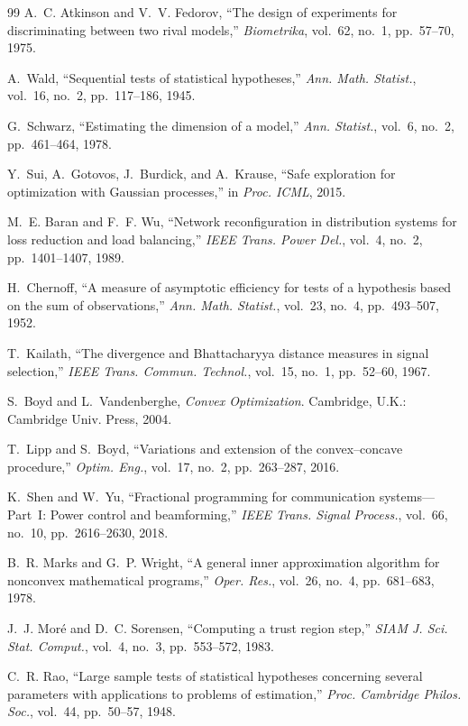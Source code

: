 \documentclass[journal,onecolumn,11pt]{IEEEtran}
\begin{document}
\begin{thebibliography}{99}
A.~C. Atkinson and V.~V. Fedorov, ``The design of experiments for discriminating between two rival models,'' \emph{Biometrika}, vol.~62, no.~1, pp.~57--70, 1975.

A.~Wald, ``Sequential tests of statistical hypotheses,'' \emph{Ann. Math. Statist.}, vol.~16, no.~2, pp.~117--186, 1945.

G.~Schwarz, ``Estimating the dimension of a model,'' \emph{Ann. Statist.}, vol.~6, no.~2, pp.~461--464, 1978.

Y.~Sui, A.~Gotovos, J.~Burdick, and A.~Krause, ``Safe exploration for optimization with Gaussian processes,'' in \emph{Proc. ICML}, 2015.

M.~E. Baran and F.~F. Wu, ``Network reconfiguration in distribution systems for loss reduction and load balancing,'' \emph{IEEE Trans. Power Del.}, vol.~4, no.~2, pp.~1401--1407, 1989.

H.~Chernoff, ``A measure of asymptotic efficiency for tests of a hypothesis based on the sum of observations,'' \emph{Ann. Math. Statist.}, vol.~23, no.~4, pp.~493--507, 1952.

T.~Kailath, ``The divergence and Bhattacharyya distance measures in signal selection,'' \emph{IEEE Trans. Commun. Technol.}, vol.~15, no.~1, pp.~52--60, 1967.

S.~Boyd and L.~Vandenberghe, \emph{Convex Optimization}. Cambridge, U.K.: Cambridge Univ. Press, 2004.

T.~Lipp and S.~Boyd, ``Variations and extension of the convex--concave procedure,'' \emph{Optim. Eng.}, vol.~17, no.~2, pp.~263--287, 2016.

K.~Shen and W.~Yu, ``Fractional programming for communication systems---Part~I: Power control and beamforming,'' \emph{IEEE Trans. Signal Process.}, vol.~66, no.~10, pp.~2616--2630, 2018.

B.~R. Marks and G.~P. Wright, ``A general inner approximation algorithm for nonconvex mathematical programs,'' \emph{Oper. Res.}, vol.~26, no.~4, pp.~681--683, 1978.

J.~J. Mor\'e and D.~C. Sorensen, ``Computing a trust region step,'' \emph{SIAM J. Sci. Stat. Comput.}, vol.~4, no.~3, pp.~553--572, 1983.

C.~R. Rao, ``Large sample tests of statistical hypotheses concerning several parameters with applications to problems of estimation,'' \emph{Proc. Cambridge Philos. Soc.}, vol.~44, pp.~50--57, 1948.

\end{thebibliography}
\end{document}
